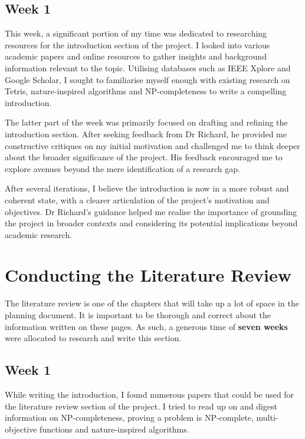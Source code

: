 \documentclass[a4paper, 12pt]{extreport}
\begin{document}
			\subsection{Week 1}
				
				This week, a significant portion of my time was dedicated to researching resources for the introduction section of the project. I looked into various academic papers and online resources to gather insights and background information relevant to the topic. Utilising databases such as IEEE Xplore and Google Scholar, I sought to familiarise myself enough with existing research on Tetris, nature-inspired algorithms and NP-completeness to write a compelling introduction.
				
				The latter part of the week was primarily focused on drafting and refining the introduction section. After seeking feedback from Dr Richard, he provided me constructive critiques on my initial motivation and challenged me to think deeper about the broader significance of the project. His feedback encouraged me to explore avenues beyond the mere identification of a research gap.
				
				After several iterations, I believe the introduction is now in a more robust and coherent state, with a clearer articulation of the project's motivation and objectives. Dr Richard's guidance helped me realise the importance of grounding the project in broader contexts and considering its potential implications beyond academic research.				
				
		\section{Conducting the Literature Review}
		\label{sec:litrev}
		
			The literature review is one of the chapters that will take up a lot of space in the planning document. It is important to be thorough and correct about the information written on these pages. As such, a generous time of \textbf{seven weeks} were allocated to research and write this section.
		
			\subsection{Week 1}
				
				While writing the introduction, I found numerous papers that could be used for the literature review section of the project. I tried to read up on and digest information on NP-completeness, proving a problem is NP-complete, multi-objective functions and nature-inspired algorithms.
		
\end{document}
